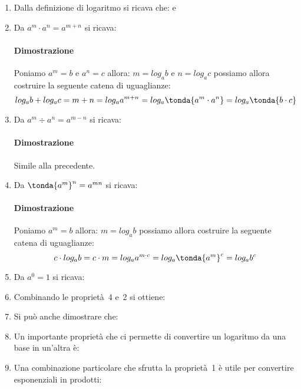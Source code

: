 \begin{enumerate} 
 \item Dalla definizione di logaritmo si ricava che:
 e 
 \item Da \quad \(a^m \cdot a^n = a^{m+n}\) \quad si ricava: \quad
\paragraph{Dimostrazione} 
Poniamo \(a^m = b\) e \(a^n = c\) 
allora: \(m = log_a {b}\) e \(n = log_a {c}\) possiamo allora costruire la 
seguente catena di uguaglianze:
\[log_a {b} + log_a {c} =
m + n =  
log_a {a^{m + n}} =
log_a \tonda{{a^m \cdot a^n}}  =
log_a \tonda{{b \cdot c}}\]
 \item Da \quad \(a^m \div a^n = a^{m-n}\) \quad si ricava: \quad
\paragraph{Dimostrazione} Simile alla precedente.\\[4pt]
 \item Da \quad \(\tonda{a^m}^n = a^{mn}\) \quad si ricava: \quad
\paragraph{Dimostrazione} 
Poniamo \(a^m = b\)  
allora: \(m = log_a {b}\) possiamo allora costruire la 
seguente catena di uguaglianze:
\[c \cdot log_a {b} =
c \cdot m = 
log_a {a^{m \cdot c}} =
log_a {\tonda{a^{m}}^c} = 
log_a {b^c}\]
 \item Da \quad \(a^0 = 1\) \quad si ricava: \quad
 \item Combinando le proprietà~4 e~2 si ottiene: \quad
 \item Si può anche dimostrare che: \quad
 \item Un importante proprietà che ci permette di convertire un 
logaritmo da una base in un'altra è: \quad
 \item Una combinazione particolare che sfrutta la proprietà~1 è 
 utile per convertire esponenziali in prodotti: \quad
\end{enumerate}

